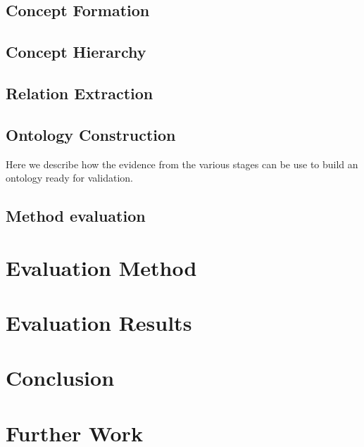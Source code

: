 \documentclass[a4paper]{report}
\begin{document}
\section{Concept Formation}

\section{Concept Hierarchy}

\section{Relation Extraction}

\section{Ontology Construction}

Here we describe how the evidence from the various stages can be use to build an ontology ready for validation.

\section{Method evaluation}

\chapter{Evaluation Method}


\chapter{Evaluation Results}


\chapter{Conclusion}


\chapter{Further Work}


\nocite{*}


\clearpage



\end{document}
